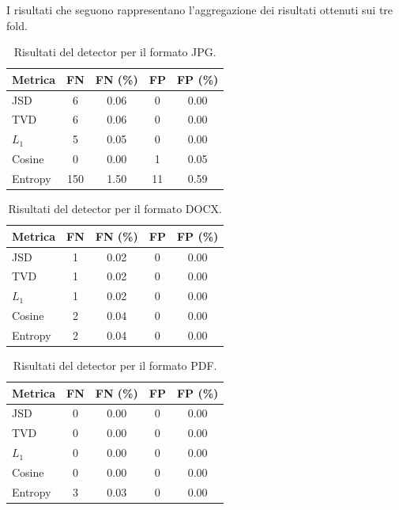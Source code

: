 \documentclass{report}
\begin{document}
I risultati che seguono rappresentano l'aggregazione dei risultati ottenuti sui tre fold.

\begin{table}[H]
\centering
\begin{tabular}{lcccc}
\toprule
Metrica & FN & FN (\%) & FP & FP (\%) \\
\midrule
JSD     & 6  & 0.06 & 0 & 0.00 \\
TVD     & 6  & 0.06 & 0 & 0.00 \\
$L_1$   & 5  & 0.05 & 0 & 0.00 \\
Cosine  & 0  & 0.00 & 1 & 0.05 \\
Entropy & 150 & 1.50 & 11 & 0.59 \\
\bottomrule
\end{tabular}
\caption{Risultati del detector per il formato JPG.}
\end{table}


\begin{table}[H]
\centering
\begin{tabular}{lcccc}
\toprule
Metrica & FN & FN (\%) & FP & FP (\%) \\
\midrule
JSD     & 1 & 0.02 & 0 & 0.00 \\
TVD     & 1 & 0.02 & 0 & 0.00 \\
$L_1$   & 1 & 0.02 & 0 & 0.00 \\
Cosine  & 2 & 0.04 & 0 & 0.00 \\
Entropy & 2 & 0.04 & 0 & 0.00 \\
\bottomrule
\end{tabular}
\caption{Risultati del detector per il formato DOCX.}
\end{table}



\begin{table}[H]
\centering
\begin{tabular}{lcccc}
\toprule
Metrica & FN & FN (\%) & FP & FP (\%) \\
\midrule
JSD     & 0 & 0.00 & 0 & 0.00 \\
TVD     & 0 & 0.00 & 0 & 0.00 \\
$L_1$   & 0 & 0.00 & 0 & 0.00 \\
Cosine  & 0 & 0.00 & 0 & 0.00 \\
Entropy & 3 & 0.03 & 0 & 0.00 \\
\bottomrule
\end{tabular}
\caption{Risultati del detector per il formato PDF.}
\end{table}
\end{document}
